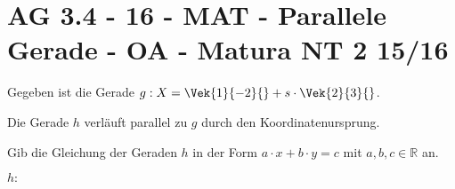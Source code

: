 \section{AG 3.4 - 16 - MAT - Parallele Gerade - OA - Matura NT 2 15/16}

\begin{beispiel}[AG 3.4]{1} %
Gegeben ist die Gerade $g:X=\Vek{1}{-2}{}+s\cdot\Vek{2}{3}{}$.

Die Gerade $h$ verläuft parallel zu $g$ durch den Koordinatenursprung.

Gib die Gleichung der Geraden $h$ in der Form $a\cdot x+b\cdot y=c$ mit $a,b,c\in\mathbb{R}$ an.

$h:$ 
\end{beispiel}